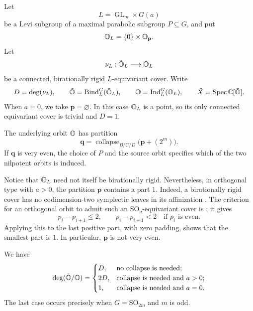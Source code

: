 Let
\[
  L=\operatorname{GL}_m\times G(a)
\]
be a Levi subgroup of a maximal parabolic subgroup
$P\subseteq G$, and put
\[
  \mathbb{O}_L=\{0\}\times\mathbb{O}_{\mathbf p}.
\]
Let
\[
  \nu_L:\tilde{\mathbb{O}}_L\longrightarrow\mathbb{O}_L
\]
be a connected, birationally rigid $L$-equivariant
cover. Write
\[
  D=\deg(\nu_L),\qquad
  \tilde{\mathbb{O}}=\operatorname{Bind}_L^G(\tilde{\mathbb{O}}_L),
  \qquad
  \mathbb{O}=\operatorname{Ind}_L^G(\mathbb{O}_L),
  \qquad
  \tilde X=\operatorname{Spec}\mathbb C[\tilde{\mathbb{O}}].
\]
When $a=0$, we take $\mathbf p=\varnothing$.
In this case $\mathbb{O}_L$ is a point, so its only connected
equivariant cover is trivial and $D=1$.

The underlying orbit $\mathbb{O}$ has partition
\[
  \mathbf q
  =
  \operatorname{collapse}_{B/C/D}
  \bigl(\mathbf p+(2^m)\bigr).
\]
If $\mathbf q$ is very even, the choice of $P$
and the source orbit specifies which of the two
nilpotent orbits is induced.

Notice that $\mathbb{O}_L$ need not itself be birationally
rigid. Nevertheless, in orthogonal type with $a>0$,
the partition $\mathbf p$ contains a part $1$.
Indeed, a birationally rigid cover has no
codimension-two symplectic leaves in its affinization
\cite[Corollary~7.28(iv)]{LMM2026}.
The criterion for an orthogonal orbit to admit such
an $\mathrm{SO}_a$-equivariant cover is
\cite[Proposition~7.34(i)]{LMM2026}; it gives
\[
  p_i-p_{i+1}\le 2,
  \qquad
  p_i-p_{i+1}<2
  \quad\text{if }p_i\text{ is even}.
\]
Applying this to the last positive part, with zero
padding, shows that the smallest part is $1$.
In particular, $\mathbf p$ is not very even.

\begin{prop}
  We have
  \[
    \deg(\tilde{\mathbb{O}}/\mathbb{O})=
    \begin{cases}
      D,
        & \text{no collapse is needed};\\
      2D,
        & \text{collapse is needed and }a>0;\\
      1,
        & \text{collapse is needed and }a=0.
    \end{cases}
  \]
  The last case occurs precisely when
  $G=\mathrm{SO}_{2m}$ and $m$ is odd.
\end{prop}

